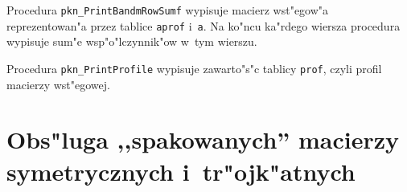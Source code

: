 \vspace{\bigskipamount}
Procedura \texttt{pkn\_PrintBandmRowSumf} wypisuje macierz
wst"egow"a re\-pre\-zen\-to\-wa\-n"a przez tablice \texttt{aprof} i~\texttt{a}.
Na ko"ncu ka"rdego wiersza procedura wypisuje sum"e wsp"o"lczynnik"ow
w~tym wierszu.

\vspace{\bigskipamount}
Procedura \texttt{pkn\_PrintProfile} wypisuje
zawarto"s"c tablicy \texttt{prof}, czyli profil macierzy wst"egowej.


\newpage
\section[Obs"luga ,,spakowanych'' macierzy symetrycznych i~tr"ojk"atnych]%
  {\label{sect:packed:sym:array}%
   Obs"luga ,,spakowanych'' macierzy \\symetrycznych i~tr"ojk"atnych}

